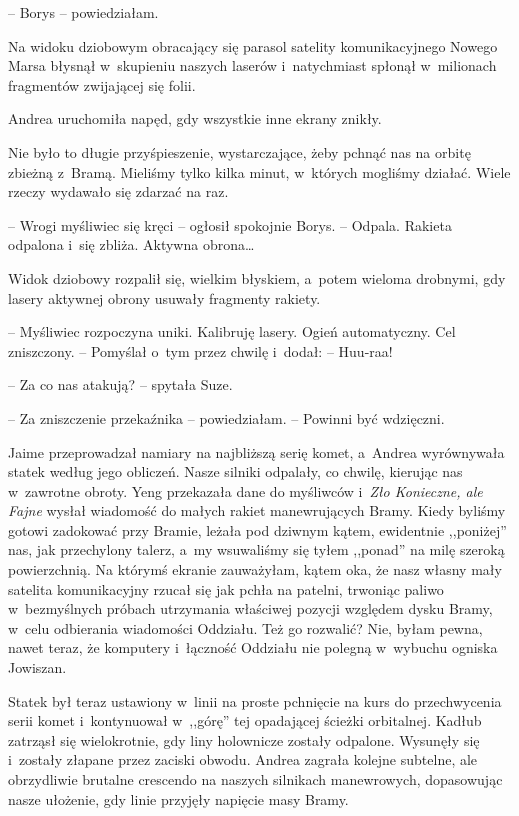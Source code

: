 \documentclass[oneside,polish,11pt,sfheadings]{mwbk}
\begin{document}
-- Borys -- powiedziałam.

Na widoku dziobowym obracający się parasol satelity komunikacyjnego
Nowego Marsa błysnął w~skupieniu naszych laserów i~natychmiast spłonął w~milionach fragmentów zwijającej się folii.

Andrea uruchomiła napęd, gdy wszystkie inne ekrany znikły.

Nie było to długie przyśpieszenie, wystarczające, żeby pchnąć nas na
orbitę zbieżną z~Bramą. Mieliśmy tylko kilka minut, w~których mogliśmy
działać. Wiele rzeczy wydawało się zdarzać na raz.

-- Wrogi myśliwiec się kręci -- ogłosił spokojnie Borys. -- Odpala. Rakieta
odpalona i~się zbliża. Aktywna obrona\ldots 

Widok dziobowy rozpalił się, wielkim błyskiem, a~potem wieloma drobnymi,
gdy lasery aktywnej obrony usuwały fragmenty rakiety.

-- Myśliwiec rozpoczyna uniki. Kalibruję lasery. Ogień automatyczny. Cel
zniszczony. -- Pomyślał o~tym przez chwilę i~dodał: -- Huu-raa!

-- Za co nas atakują? -- spytała Suze.

-- Za zniszczenie przekaźnika -- powiedziałam. -- Powinni być wdzięczni.

Jaime przeprowadzał namiary na najbliższą serię komet, a~Andrea
wyrównywała statek według jego obliczeń. Nasze silniki odpalały, co
chwilę, kierując nas w~zawrotne obroty. Yeng przekazała dane do
myśliwców i~\textit{Zło Konieczne, ale Fajne} wysłał wiadomość do małych
rakiet manewrujących Bramy. Kiedy byliśmy gotowi zadokować przy Bramie,
leżała pod dziwnym kątem, ewidentnie ,,poniżej'' nas, jak przechylony
talerz, a~my wsuwaliśmy się tyłem ,,ponad'' na milę szeroką
powierzchnią. Na którymś ekranie zauważyłam, kątem oka, że nasz własny
mały satelita komunikacyjny rzucał się jak pchła na patelni, trwoniąc
paliwo w~bezmyślnych próbach utrzymania właściwej pozycji względem dysku
Bramy, w~celu odbierania wiadomości Oddziału. Też go rozwalić? Nie,
byłam pewna, nawet teraz, że komputery i~łączność Oddziału nie polegną w~wybuchu ogniska Jowiszan.

Statek był teraz ustawiony w~linii na proste pchnięcie na kurs do
przechwycenia serii komet i~kontynuował w~,,górę'' tej opadającej
ścieżki orbitalnej. Kadłub zatrząsł się wielokrotnie, gdy liny
holownicze zostały odpalone. Wysunęły się i~zostały złapane przez
zaciski obwodu. Andrea zagrała kolejne subtelne, ale obrzydliwie
brutalne crescendo na naszych silnikach manewrowych, dopasowując nasze
ułożenie, gdy linie przyjęły napięcie masy Bramy.
\end{document}
